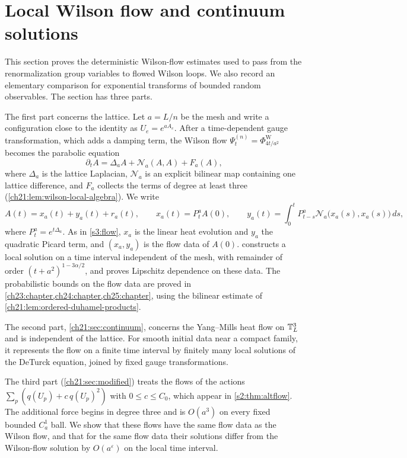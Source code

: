 \chapter{Local Wilson flow and continuum solutions}\label{ch21:chapter}

This section proves the deterministic Wilson-flow estimates used to pass from the renormalization group variables to flowed Wilson loops. We also record an elementary comparison for exponential transforms of bounded random observables. The section has three parts.

The first part concerns the lattice. Let $a=L/n$ be the mesh and write a configuration close to the identity as $U_e=e^{aA_e}$. After a time-dependent gauge transformation, which adds a damping term, the Wilson flow $\Psi^{(n)}_t=\Phi^{\mathrm W}_{4t/a^2}$ becomes the parabolic equation
\begin{equation}\label{ch21:eq:intro-equation}
 \partial_tA=\Delta_aA+\mathcal N_a(A,A)+F_a(A),
\end{equation}
where $\Delta_a$ is the lattice Laplacian, $\mathcal N_a$ is an explicit bilinear map containing one lattice difference, and $F_a$ collects the terms of degree at least three (\cref{ch21:lem:wilson-local-algebra}). We write
\begin{equation}\label{ch21:eq:intro-decomposition}
 A(t)=x_a(t)+y_a(t)+r_a(t),\qquad x_a(t)=P^a_tA(0),\qquad
 y_a(t)=\int_0^tP^a_{t-s}\mathcal N_a\bigl(x_a(s),x_a(s)\bigr)\,ds,
\end{equation}
where $P^a_t=e^{t\Delta_a}$. As in \cref{s3:flow}, $x_a$ is the linear heat evolution and $y_a$ the quadratic Picard term, and $(x_a,y_a)$ is the flow data of $A(0)$.  constructs a local solution on a time interval independent of the mesh, with remainder of order $(t+a^2)^{1-3\alpha/2}$, and proves Lipschitz dependence on these data. The probabilistic bounds on the flow data are proved in \cref{ch23:chapter,ch24:chapter,ch25:chapter}, using the bilinear estimate of \cref{ch21:lem:ordered-duhamel-products}.

The second part, \cref{ch21:sec:continuum}, concerns the Yang--Mills heat flow on $\mathbb T_L^3$ and is independent of the lattice. For smooth initial data near a compact family, it represents the flow on a finite time interval by finitely many local solutions of the DeTurck equation, joined by fixed gauge transformations.

The third part (\cref{ch21:sec:modified}) treats the flows of the actions $\sum_p(q(U_p)+c\,q(U_p)^2)$ with $0\le c\le C_0$, which appear in \cref{s2:thm:altflow}. The additional force begins in degree three and is $O(a^3)$ on every fixed bounded $C_a^1$ ball. We show that these flows have the same flow data as the Wilson flow, and that for the same flow data their solutions differ from the Wilson-flow solution by $O(a^\varepsilon)$ on the local time interval.

